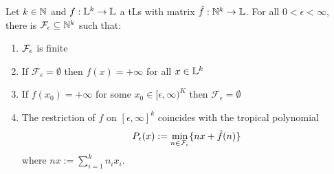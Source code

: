 \begin{theorem}
Let $k\in\mathbb{N}$ and $f:\mathbb{L}^k\to\mathbb{L}$ a tLs with matrix $\hat{f}:\mathbb{N}^k\to\mathbb{L}$.
 For all $0<\epsilon<\infty$, there is $\mathcal{F}_\epsilon \subseteq \mathbb{N}^k$ such that:
\begin{enumerate}
 \item $\mathcal{F}_\epsilon$ is finite
 \item If $\mathcal{F}_\epsilon= \emptyset$ then $f( x ) = +\infty$ for all $ x \in \mathbb{L}^k$
 \item If $f( x _0) = +\infty$ for some $ x _0\in [\epsilon,\infty)^{K}$ then $\mathcal{F}_\epsilon= \emptyset$
 \item The restriction of $f$ on $[\epsilon,\infty]^k$ coincides  with the tropical {polynomial} \[P_\epsilon(x):=\min\limits_{n\in \mathcal{F}_\epsilon}\{nx+\hat{f}(n)\}\]
where $nx:=\sum_{i=1}^k n_ix_i$.
\end{enumerate}
\end{theorem}
